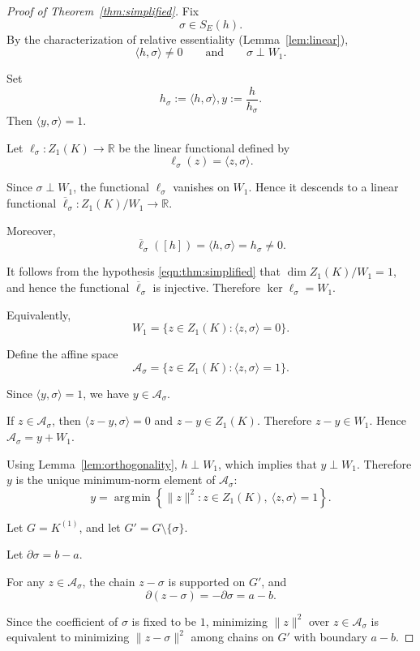 \documentclass[11pt]{amsart}
\theoremstyle{theorem}
\theoremstyle{remark}
\theoremstyle{definition}
\newcommand{\R}{\mathbb{R}}
\newcommand{\argmin}{\operatorname*{arg\,min}}
\begin{document}
\begin{proof}[Proof of Theorem~\ref{thm:simplified}]
Fix
\[
\sigma\in S_E(h).
\]
By the characterization of relative essentiality (Lemma~\ref{lem:linear}),
\[
\langle h,\sigma\rangle\neq 0
\qquad\text{and}\qquad
\sigma\perp W_1.
\]

Set
\[
h_\sigma:=\langle h,\sigma\rangle,
y:=\frac{h}{h_\sigma}.
\]
Then
$
\langle y,\sigma\rangle=1
$.

Let
$
\ell_\sigma:Z_1(K)\to\R
$
be the linear functional defined by 
\[
\ell_\sigma(z)=\langle z,\sigma\rangle.
\]

Since
$
\sigma\perp W_1
$,
the functional \(\ell_\sigma\) vanishes on \(W_1\). Hence it descends to a
linear functional
$
\overline{\ell}_\sigma:
Z_1(K)/W_1
\to
\R
$.


Moreover,
\[
\overline{\ell}_\sigma([h])
=
\langle h,\sigma\rangle
=
h_\sigma
\neq 0.
\]

It follows from the hypothesis \eqref{eqn:thm:simplified} that
$
\dim Z_1(K)/W_1=1
$,
and hence 
the functional \(\overline{\ell}_\sigma\) is injective. Therefore
$
\ker\ell_\sigma=W_1.
$

Equivalently,
\[
W_1
=
\{z\in Z_1(K):\langle z,\sigma\rangle=0\}.
\]

Define the affine space
\[
\mathcal A_\sigma
=
\{z\in Z_1(K):\langle z,\sigma\rangle=1\}.
\]

Since
$
\langle y,\sigma\rangle=1
$,
we have
$
y\in\mathcal A_\sigma.
$

If
$
z\in\mathcal A_\sigma
$,
then
$
\langle z-y,\sigma\rangle=0
$
and
$
z-y\in Z_1(K)
$.
Therefore
$
z-y\in W_1
$.
Hence
$
\mathcal A_\sigma=y+W_1
$.

Using Lemma~\ref{lem:orthogonality},
$
h\perp W_1
$,
which implies that 
$
y\perp W_1
$.
Therefore \(y\) is the unique minimum-norm element of \(\mathcal A_\sigma\):
\[
y
=
\argmin
\left\{
\|z\|^2:
z\in Z_1(K),\ \langle z,\sigma\rangle=1
\right\}.
\]

Let
$
G=K^{(1)}
$,
and let
$
G'=G\setminus\{\sigma\}
$.

Let
$
\partial\sigma=b-a
$.

For any
$
z\in\mathcal A_\sigma
$,
the chain
$
z-\sigma
$
is supported on \(G'\), and
\[
\partial(z-\sigma)
=
-\partial\sigma
=
a-b.
\]

Since the coefficient of \(\sigma\) is fixed to be \(1\), minimizing
$
\|z\|^2
$
over \(z\in\mathcal A_\sigma\) is equivalent to minimizing
$
\|z-\sigma\|^2
$
among chains on \(G'\) with boundary \(a-b\).


\end{proof}
\end{document}

